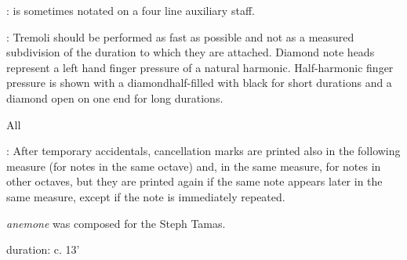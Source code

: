 \documentclass[11pt]{article}
\newcommand*\circled[1]{\tikz[baseline=(char.base)]{
            \node[shape=circle,draw,inner sep=1pt] (char) {#1};}}
\begin{document}
\begin{center}
 : is sometimes notated on a four line auxiliary staff.
\rightskip\leftskip
\phantom{text} \hfill \phantom{()}

 : \circled{1} Tremoli should be performed as fast as possible and not as a measured subdivision of the duration to which they are attached. \circled{2} Diamond note heads represent a left hand finger pressure of a natural harmonic. \circled{3} Half-harmonic finger pressure is shown with a diamondhalf-filled with black for short durations and a diamond open on one end for long durations.
\rightskip\leftskip
\phantom{text} \hfill \phantom{()}

\end{center}
\endgroup

\begin{center}
\huge All
\end{center}
\begingroup
\begin{center}

 : After temporary accidentals, cancellation marks are printed also in the following measure (for notes in the same octave) and, in the same measure, for notes in other octaves, but they are printed again if the same note appears later in the same measure, except if the note is immediately repeated.
\rightskip\leftskip
\phantom{text} \hfill \phantom{()}

\end{center}
\endgroup

\vspace*{9\baselineskip}

\begin{center}
\textit{anemone} was composed for the Steph Tamas.
\end{center}

\vspace*{23\baselineskip}

\begin{center}
duration: c. 13'
\end{center}
\end{document}
